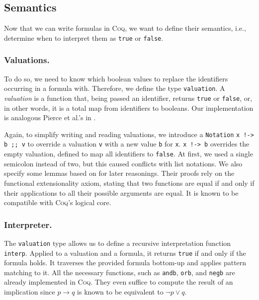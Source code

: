 \pagebreak

\subsection{Semantics}

Now that we can write formulas in \textsc{Coq}, we want to define their semantics, i.e., determine when to interpret them as \texttt{true} or \texttt{false}.

\subsubsection{Valuations.} %

To do so, we need to know which boolean values to replace the identifiers occurring in a formula with.
Therefore, we define the type \texttt{valuation}. 
A \emph{valuation} is a function that, being passed an identifier, returns \texttt{true} or \texttt{false}, or, in other words, it is a total map from identifiers to booleans. 
Our implementation is analogous Pierce et al.'s in \cite{pierceSF}.

Again, to simplify writing and reading valuations, we introduce a \texttt{Notation} \texttt{x !-> b ;; v} to override a valuation \texttt{v} with a new value \texttt{b} for \texttt{x}. 
\texttt{x !-> b} overrides the empty valuation, defined to map all identifiers to \texttt{false}.
At first, we used a single semicolon instead of two, but this caused conflicts with list notations.
We also specify some lemmas based on \cite{pierceSF} for later reasonings. 
Their proofs rely on the functional extensionality axiom, stating that two functions are equal if and only if their applications to all their possible arguments are equal. 
It is known to be compatible with \textsc{Coq}'s logical core.

\subsubsection{Interpreter.}

The \texttt{valuation} type allows us to define a recursive interpretation function \texttt{interp}.
Applied to a valuation and a formula, it returns \texttt{true} if and only if the formula holds.
It traverses the provided formula bottom-up and applies pattern matching to it.
All the necessary functions, such as \texttt{andb}, \texttt{orb}, and \texttt{negb} are already implemented in \textsc{Coq}. 
They even suffice to compute the result of an implication since $p \rightarrow q$ is known to be equivalent to $\neg p \lor q$.


